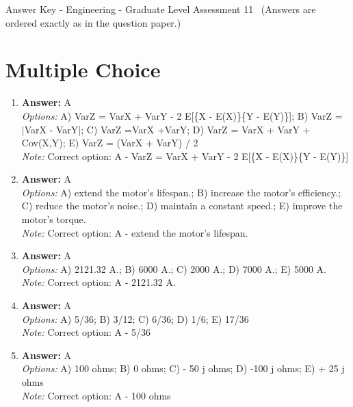 \documentclass[12pt]{article}
\begin{document}
\begin{center}
Answer Key - Engineering - Graduate Level Assessment 11 \
\small (Answers are ordered exactly as in the question paper.)
\end{center}

\section*{Multiple Choice}
\begin{enumerate}[label=\arabic*.]
\item \textbf{Answer:} A
\\ \textit{Options:} A) VarZ = VarX + VarY - 2 E[\{X - E(X)\}\{Y - E(Y)\}]; B) VarZ = |VarX - VarY|; C) VarZ =VarX +VarY; D) VarZ = VarX + VarY + Cov(X,Y); E) VarZ = (VarX + VarY) / 2
\\ \textit{Note:} Correct option: A - VarZ = VarX + VarY - 2 E[\{X - E(X)\}\{Y - E(Y)\}]
\item \textbf{Answer:} A
\\ \textit{Options:} A) extend the motor's lifespan.; B) increase the motor's efficiency.; C) reduce the motor's noise.; D) maintain a constant speed.; E) improve the motor's torque.
\\ \textit{Note:} Correct option: A - extend the motor's lifespan.
\item \textbf{Answer:} A
\\ \textit{Options:} A) 2121.32 A.; B) 6000 A.; C) 2000 A.; D) 7000 A.; E) 5000 A.
\\ \textit{Note:} Correct option: A - 2121.32 A.
\item \textbf{Answer:} A
\\ \textit{Options:} A) 5/36; B) 3/12; C) 6/36; D) 1/6; E) 17/36
\\ \textit{Note:} Correct option: A - 5/36
\item \textbf{Answer:} A
\\ \textit{Options:} A) 100 ohms; B) 0 ohms; C) - 50 j ohms; D) -100 j ohms; E) + 25 j ohms
\\ \textit{Note:} Correct option: A - 100 ohms
\end{enumerate}
\end{document}
